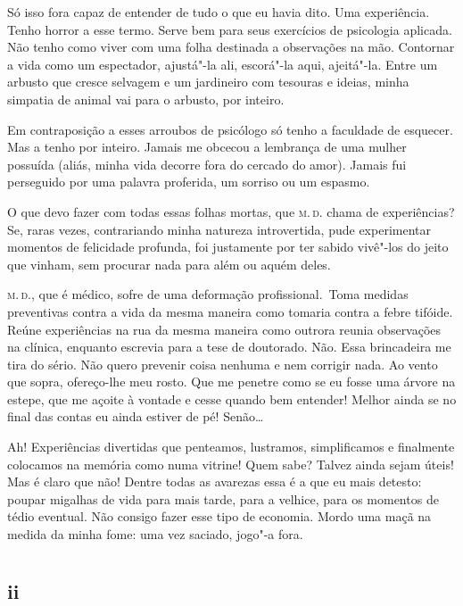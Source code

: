 Só isso fora capaz de entender de tudo o que eu havia dito. Uma
experiência. Tenho horror a esse termo. Serve bem para seus
exercícios de psicologia aplicada. Não tenho como viver com uma folha destinada a observações na mão. Contornar a vida como um espectador, ajustá"-la ali,
escorá"-la aqui, ajeitá"-la. Entre um arbusto que cresce selvagem e um
jardineiro com tesouras e ideias, minha simpatia de animal vai para o
arbusto, por inteiro.

Em contraposição a esses arroubos de psicólogo só tenho a faculdade de esquecer. Mas
a tenho por inteiro. Jamais me obcecou a lembrança de uma mulher
possuída (aliás, minha vida decorre fora do cercado do amor).
Jamais fui perseguido por uma palavra proferida, um sorriso ou
um espasmo.

O que devo fazer com todas essas folhas mortas, que \textsc{m.\,d.} chama de
experiências? Se, raras vezes, contrariando minha natureza
introvertida, pude experimentar momentos de felicidade profunda, foi
justamente por ter sabido vivê"-los do jeito que vinham, sem procurar
nada para além ou aquém deles.

\textsc{m.\,d.}, que é médico, sofre de uma deformação profissional.~Toma medidas
preventivas contra a vida da mesma maneira como tomaria contra a febre
tifóide. Reúne experiências na rua da mesma maneira como outrora reunia
observações na clínica, enquanto escrevia para a tese de doutorado. Não.
Essa brincadeira me tira do sério. Não quero prevenir coisa nenhuma e
nem corrigir nada. Ao vento que sopra, ofereço-lhe meu rosto.
Que me penetre como se eu fosse uma árvore na estepe, que me açoite à
vontade e cesse quando bem entender! Melhor ainda se no final das
contas eu ainda estiver de pé! Senão\ldots{}

Ah! Experiências divertidas que penteamos, lustramos, simplificamos e
finalmente colocamos na memória como numa vitrine! Quem sabe? Talvez
ainda sejam úteis! Mas é claro que não! Dentre
todas as avarezas essa é a que eu mais detesto: poupar migalhas de vida
para mais tarde, para a velhice, para os momentos de tédio eventual. Não
consigo fazer esse tipo de economia. Mordo uma maçã na medida da minha
fome: uma vez saciado, jogo"-a fora.


\chapter*{}
\section{ii} 

